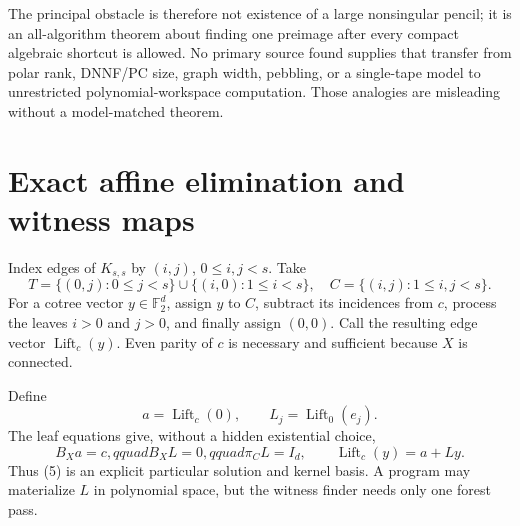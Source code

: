 \documentclass[11pt]{article}
\newcommand{\F}{\mathbb F_2}
\begin{document}
The principal obstacle is therefore not existence of a large nonsingular
pencil; it is an all-algorithm theorem about finding one preimage after every
compact algebraic shortcut is allowed.  No primary source found supplies
that transfer from polar rank, DNNF/PC size, graph width, pebbling, or a
single-tape model to unrestricted polynomial-workspace computation.  Those
analogies are misleading without a model-matched theorem.

\section{Exact affine elimination and witness maps}
Index edges of $K_{s,s}$ by $(i,j)$, $0\le i,j<s$.  Take
\[
 T=\{(0,j):0\le j<s\}\cup\{(i,0):1\le i<s\},
 \quad C=\{(i,j):1\le i,j<s\}.                           \tag{4}
\]
For a cotree vector $y\in\F^d$, assign $y$ to $C$, subtract its incidences
from $c$, process the leaves $i>0$ and $j>0$, and finally assign $(0,0)$.
Call the resulting edge vector $\operatorname{Lift}_c(y)$.  Even parity of
$c$ is necessary and sufficient because $X$ is connected.

Define
\[
 a=\operatorname{Lift}_c(0),\qquad
 L_j=\operatorname{Lift}_0(e_j).                         \tag{5}
\]
The leaf equations give, without a hidden existential choice,
\[
 B_Xa=c,qquad B_XL=0,qquad \pi_C L=I_d,
 \qquad \operatorname{Lift}_c(y)=a+Ly.                  \tag{6}
\]
Thus (5) is an explicit particular solution and kernel basis.  A program may
materialize $L$ in polynomial space, but the witness finder needs only one
forest pass.
\end{document}

